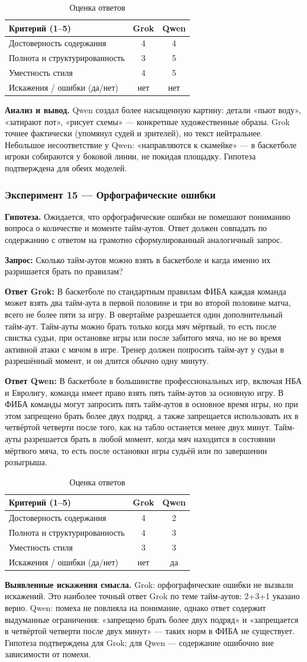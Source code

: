 \documentclass[a4paper, final]{article}
\newcommand{\scoretablefilled}[8]{%
    \vspace{4pt}
    \begin{table}[h!]
    \centering
    \small
    \begin{tabular}{|l|c|c|}
    \hline
    \textbf{Критерий (1--5)} & \textbf{Grok} & \textbf{Qwen} \\
    \hline
    Достоверность содержания & #1 & #2 \\
    \hline
    Полнота и структурированность & #3 & #4 \\
    \hline
    Уместность стиля & #5 & #6 \\
    \hline
    Искажения / ошибки (да/нет) & #7 & #8 \\
    \hline
    \end{tabular}
    \caption{Оценка ответов}
    \end{table}
    \vspace{2pt}
}
\begin{document}
\scoretablefilled{4}{4}{3}{5}{4}{5}{нет}{нет}

\noindent\textbf{Анализ и вывод.} Qwen создал более насыщенную картину: детали «пьют воду», «затирают пот», «рисует схемы» — конкретные художественные образы. Grok точнее фактически (упомянул судей и зрителей), но текст нейтральнее. Небольшое несоответствие у Qwen: «направляются к скамейке» — в баскетболе игроки собираются у боковой линии, не покидая площадку. Гипотеза подтверждена для обеих моделей.

\newpage

\subsubsection{Эксперимент 15 — Орфографические ошибки}

\noindent\textbf{Гипотеза.} Ожидается, что орфографические ошибки не помешают пониманию вопроса о количестве и моменте тайм-аутов. Ответ должен совпадать по содержанию с ответом на грамотно сформулированный аналогичный запрос.

\noindent\textbf{Запрос:} Сколько тайм-аутов можно взять в баскетболе и кагда именно их разришается брать по правилам?

\noindent\textbf{Ответ Grok:} В баскетболе по стандартным правилам ФИБА каждая команда может взять два тайм-аута в первой половине и три во второй половине матча, всего не более пяти за игру. В овертайме разрешается один дополнительный тайм-аут. Тайм-ауты можно брать только когда мяч мёртвый, то есть после свистка судьи, при остановке игры или после забитого мяча, но не во время активной атаки с мячом в игре. Тренер должен попросить тайм-аут у судьи в разрешённый момент, и он длится обычно одну минуту.

\noindent\textbf{Ответ Qwen:} В баскетболе в большинстве профессиональных игр, включая НБА и Евролигу, команда имеет право взять пять тайм-аутов за основную игру. В ФИБА команды могут запросить пять тайм-аутов в основное время игры, но при этом запрещено брать более двух подряд, а также запрещается использовать их в четвёртой четверти после того, как на табло останется менее двух минут. Тайм-ауты разрешается брать в любой момент, когда мяч находится в состоянии мёртвого мяча, то есть после остановки игры судьёй или по завершении розыгрыша.

\scoretablefilled{4}{2}{4}{3}{3}{3}{нет}{да}

\noindent\textbf{Выявленные искажения смысла.} Grok: орфографические ошибки не вызвали искажений. Это наиболее точный ответ Grok по теме тайм-аутов: 2+3+1 указано верно. Qwen: помеха не повлияла на понимание, однако ответ содержит выдуманные ограничения: «запрещено брать более двух подряд» и «запрещается в четвёртой четверти после двух минут» — таких норм в ФИБА не существует. Гипотеза подтверждена для Grok; для Qwen — содержание ошибочно вне зависимости от помехи.
\end{document}
